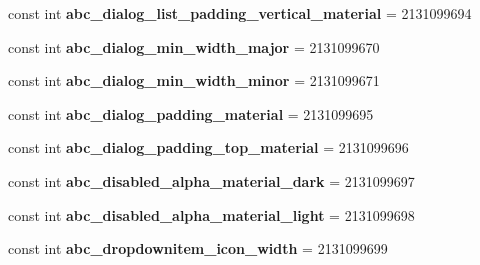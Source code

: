 \begin{DoxyCompactItemize}
const int {\bfseries abc\+\_\+dialog\+\_\+list\+\_\+padding\+\_\+vertical\+\_\+material} = 2131099694
\item 
\mbox{\label{class_pinned_app_1_1_droid_1_1_resource_1_1_dimension_a5feaed31becf1c0572feee3de4b42c2d}} 
const int {\bfseries abc\+\_\+dialog\+\_\+min\+\_\+width\+\_\+major} = 2131099670
\item 
\mbox{\label{class_pinned_app_1_1_droid_1_1_resource_1_1_dimension_a5c296fd5a8bb985d4a2b8122cb5f5459}} 
const int {\bfseries abc\+\_\+dialog\+\_\+min\+\_\+width\+\_\+minor} = 2131099671
\item 
\mbox{\label{class_pinned_app_1_1_droid_1_1_resource_1_1_dimension_a792d460d107d37ecdd92f220a006f9e6}} 
const int {\bfseries abc\+\_\+dialog\+\_\+padding\+\_\+material} = 2131099695
\item 
\mbox{\label{class_pinned_app_1_1_droid_1_1_resource_1_1_dimension_a554467a3ef56f2b04c3f46dbc88814d0}} 
const int {\bfseries abc\+\_\+dialog\+\_\+padding\+\_\+top\+\_\+material} = 2131099696
\item 
\mbox{\label{class_pinned_app_1_1_droid_1_1_resource_1_1_dimension_a448d7304659af20dfe27e0afabb5869e}} 
const int {\bfseries abc\+\_\+disabled\+\_\+alpha\+\_\+material\+\_\+dark} = 2131099697
\item 
\mbox{\label{class_pinned_app_1_1_droid_1_1_resource_1_1_dimension_ab7525d115fe1e14fae3bebc59d9a6b89}} 
const int {\bfseries abc\+\_\+disabled\+\_\+alpha\+\_\+material\+\_\+light} = 2131099698
\item 
\mbox{\label{class_pinned_app_1_1_droid_1_1_resource_1_1_dimension_a5705f5a588766a6fe15d032f3886df42}} 
const int {\bfseries abc\+\_\+dropdownitem\+\_\+icon\+\_\+width} = 2131099699
\item 
\mbox{\label{class_pinned_app_1_1_droid_1_1_resource_1_1_dimension_a453556f01e1bd576fd5aa1b7486c5274}} 

\end{DoxyCompactItemize}
